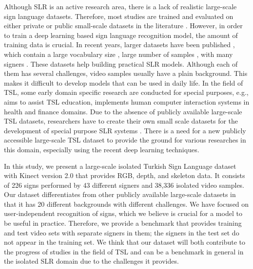\documentclass[11pt, a4paper, singlecolumn]{article}
\begin{document}
Although SLR is an active research area, there is a lack of realistic large-scale sign language datasets. Therefore, most studies are trained and evaluated on either private or public small-scale datasets in the literature \cite{ronchetti2016lsa64, martinez2002purdue, kapuscinski2015recognition, zahedi2005combination, lim2019isolated, cooper2012sign, zafrulla2011american, yang2010chinese, memics2013kinect, unutmaz2019turkish}. However, in order to train a deep learning based sign language recognition model, the amount of training data is crucial. In recent years, larger datasets have been published \cite{huang2018attention, li2020word, chai2015devisign}, which contain a large vocabulary size \cite{chai2015devisign}, large number of samples \cite{li2020word}, with many signers \cite{huang2018attention}. These datasets help building practical SLR models. Although each of them has several challenges, video samples usually have a plain background. This makes it difficult to develop models that can be used in daily life. In the field of TSL, some early domain specific research are conducted for special purposes, e.g., \cite{aran2009signtutor, uluer2015new, alaydin2018query} aims to assist TSL education, \cite{camgoz2016bosphorussign} implements human computer interaction systems in health and finance domains. Due to the absence of publicly available large-scale TSL datasets, researchers have to create their own small scale datasets for the development of special purpose SLR systems \cite{camgoz2016bosphorussign, memics2013kinect, unutmaz2019turkish}. There is a need for a new publicly accessible large-scale TSL dataset to provide the ground for various researches in this domain, especially using the recent deep learning techniques. 


In this study, we present a large-scale isolated Turkish Sign Language dataset with Kinect version 2.0 that provides RGB, depth, and skeleton data. It consists of 226 signs performed by 43 different signers and 38,336 isolated video samples. Our dataset differentiates from other publicly available large-scale datasets in that it has 20 different backgrounds with different challenges.  We have focused on user-independent recognition of signs, which we believe is crucial for a model to be useful in practice. Therefore, we provide a benchmark that provides training and test video sets with separate signers in them; the signers in the test set do not appear in the training set. We think that our dataset will both contribute to the progress of studies in the field of TSL and can be a benchmark in general in the isolated SLR domain due to the challenges it provides. 
\end{document}
